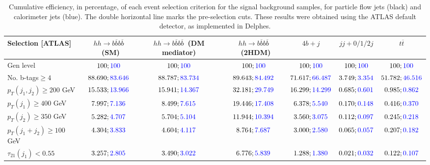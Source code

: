 \begin{landscape}
	\begin{table}
		\centering
		\caption{Cumulative efficiency, in percentage, of each event selection criterion for the signal background samples, for particle flow jets (black) and calorimeter jets (blue). The double horizontal line marks the pre-selection cuts. These results were obtained using the ATLAS default detector, as implemented in Delphes.}
		\begin{tabular}{lcccccc}
			\toprule 
			\textbf{Selection [ATLAS]} & $hh\rightarrow b\overline{b}b\overline{b}$~(SM) & $hh\rightarrow b\overline{b}b\overline{b}$~(DM mediator) & $hh\rightarrow b\overline{b}b\overline{b}$~(2HDM) & $4b+j$  & $jj+0/1/2 j$ & $t\overline{t}$ \\
			\midrule
			Gen level & $100;\textcolor{blue}{100}$ & $100;\textcolor{blue}{100}$ &$100;\textcolor{blue}{100}$& $100;\textcolor{blue}{100}$& $100;\textcolor{blue}{100}$& $100;\textcolor{blue}{100}$ \\
			\rowcolor{black!7}No. b-tags$\geq 4$&$88.690;\textcolor{blue}{83.646}$&$88.787;\textcolor{blue}{83.734}$&$89.643;\textcolor{blue}{84.492}$&$71.617;\textcolor{blue}{66.487}$&$3.749;\textcolor{blue}{3.354}$&$51.782;\textcolor{blue}{46.516}$\\
			$p_T(j_1,j_2)\geq200$ GeV & $15.533;\textcolor{blue}{13.966}$ & $15.941;\textcolor{blue}{14.367}$&$32.181;\textcolor{blue}{29.749}$ &$16.299;\textcolor{blue}{14.299}$&$0.685;\textcolor{blue}{0.601}$&$0.985;\textcolor{blue}{0.862}$\\ 
			\midrule \midrule
			\rowcolor{black!7}$p_T(j_1)\geq 400$ GeV & $7.997;\textcolor{blue}{7.136}$ &$8.499;\textcolor{blue}{7.615}$  &$19.446;\textcolor{blue}{17.408}$&$6.378;\textcolor{blue}{5.540}$&$0.170;\textcolor{blue}{0.148}$&$0.416;\textcolor{blue}{0.370}$\\ 
			$p_T(j_2)\geq 350$ GeV & $5.282;\textcolor{blue}{4.707}$& $5.704;\textcolor{blue}{5.104}$&$11.944;\textcolor{blue}{10.394}$&$3.560;\textcolor{blue}{3.075}$&$0.112;\textcolor{blue}{0.097}$&$0.245;\textcolor{blue}{0.218}$\\
			\rowcolor{black!7}$p_T(j_1+j_2)\geq 100$ GeV &$4.304;\textcolor{blue}{3.833}$ & $4.604;\textcolor{blue}{4.117}$ &$8.764;\textcolor{blue}{7.687}$&$3.000;\textcolor{blue}{2.580}$&$0.065;\textcolor{blue}{0.057}$&$0.207;\textcolor{blue}{0.182}$\\
			$\tau_{21}(j_1)<0.55$ & $3.257;\textcolor{blue}{2.805}$& $3.490;\textcolor{blue}{3.022}$&$6.776;\textcolor{blue}{5.839}$&$1.288;\textcolor{blue}{1.380}$&$0.021;\textcolor{blue}{0.032}$&$0.122;\textcolor{blue}{0.107}$\\

\end{tabular}
\end{table}
\end{landscape}
